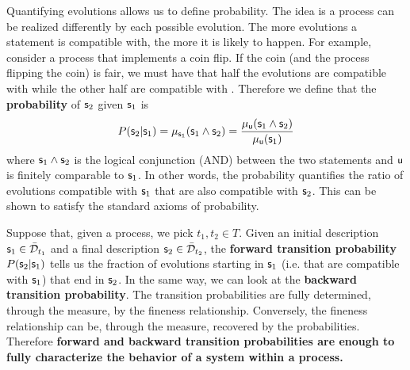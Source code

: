 \documentclass[letterpaper]{article}
\begin{document}
Quantifying evolutions allows us to define probability. The idea is a process can be realized differently by each possible evolution. The more evolutions a statement is compatible with, the more it is likely to happen. For example, consider a process that implements a coin flip. If the coin (and the process flipping the coin) is fair, we must have that half the evolutions are compatible with  while the other half are compatible with .  Therefore we define that the \textbf{probability} of $\stmt_2$ given $\stmt_1$ is
\begin{equation}
	P(\stmt_2 | \stmt_1) = \mu_{\stmt_1}(\stmt_1 \AND \stmt_2) = \frac{\mu_{\stmt[u]}(\stmt_1 \AND \stmt_2)}{\mu_{\stmt[u]}(\stmt_1)}
\end{equation} where $\stmt_1 \AND \stmt_2$ is the logical conjunction (AND) between the two statements and $\stmt[u]$ is finitely comparable to $\stmt_1$. In other words, the probability quantifies the ratio of evolutions compatible with $\stmt_1$ that are also compatible with $\stmt_2$. This can be shown to satisfy the standard axioms of probability.

Suppose that, given a process, we pick $t_1, t_2 \in T$. Given an initial description $\stmt_1 \in \tdomain_{t_1}$ and a final description $\stmt_2 \in \tdomain_{t_2}$, the \textbf{forward transition probability} $P(\stmt_2 | \stmt_1)$ tells us the fraction of evolutions starting in $\stmt_1$ (i.e. that are compatible with $\stmt_1$) that end in $\stmt_2$. In the same way, we can look at the \textbf{backward transition probability}. The transition probabilities are fully determined, through the measure, by the fineness relationship. Conversely, the fineness relationship can be, through the measure, recovered by the probabilities. Therefore \textbf{forward and backward transition probabilities are enough to fully characterize the behavior of a system within a process.}
\end{document}
